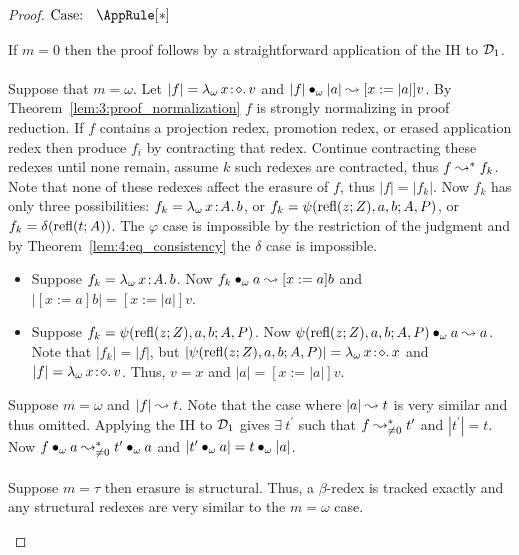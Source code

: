 \begin{proof}
    $\text{Case: }\begin{array}{c} \AppRule[*] \end{array}$
    \begin{proofcase}
        If $m = 0$ then the proof follows by a straightforward application of the IH to $\mathcal{D}_{1}$.
        \\ \\
        Suppose that $m = \omega$.
        Let $|f| = {\lambda_\omega}\, x\! : \! \diamond.\, v$ and $|f| \bullet_{\omega} |a| \leadsto [x := |a|]v$.
        By Theorem~\ref{lem:3:proof_normalization} $f$ is strongly normalizing in proof reduction.
        If $f$ contains a projection redex, promotion redex, or erased application redex then produce $f_i$ by contracting that redex.
        Continue contracting these redexes until none remain, assume $k$ such redexes are contracted, thus $f \leadsto^* f_k$.
        Note that none of these redexes affect the erasure of $f$, thus $|f| = |f_k|$.
        Now $f_k$ has only three possibilities: $f_k = {\lambda_\omega}\, x\! : \! A.\, b$, or $f_k = \psi(\textnormal{refl}(z; Z), a, b; A, P)$, or $f_k = \delta(\textnormal{refl}(t; A))$.
        The $\varphi$ case is impossible by the restriction of the judgment and by Theorem~\ref{lem:4:eq_consistency} the $\delta$ case is impossible.
        \begin{itemize}
            \item {
                Suppose $f_k = {\lambda_\omega}\, x\! : \! A.\, b$.
                Now $f_k \bullet_{\omega} a \leadsto [x := a]b$ and $|[x := a]b| = [x := |a|]v$.
            }
            \item {
                Suppose $f_k = \psi(\textnormal{refl}(z; Z), a, b; A, P)$.
                Now $\psi(\textnormal{refl}(z; Z), a, b; A, P) \bullet_{\omega} a \leadsto a$.
                Note that $|f_k| = |f|$, but $|\psi(\textnormal{refl}(z; Z), a, b; A, P)| = {\lambda_\omega}\, x\! : \! \diamond.\, x$ and $|f| = {\lambda_\omega}\, x\! : \! \diamond.\, v$.
                Thus, $v = x$ and $|a| = [x := |a|]v$.
            }
        \end{itemize}
        \vspace{.15in}
        Suppose $m = \omega$ and $|f| \leadsto t$.
        Note that the case where $|a| \leadsto t$ is very similar and thus omitted.
        Applying the IH to $\mathcal{D}_{1}$ gives $\exists\ t^\prime$ such that $f \leadsto^*_{\neq 0} t^\prime$ and $|t^\prime| = t$.
        Now $f \bullet_{\omega} a \leadsto^*_{\neq 0} t^\prime \bullet_{\omega} a$ and $|t^\prime \bullet_{\omega} a| = t \bullet_{\omega} |a|$.
        \\ \\
        Suppose $m = \tau$ then erasure is structural.
        Thus, a $\beta$-redex is tracked exactly and any structural redexes are very similar to the $m = \omega$ case.
    \end{proofcase}


\end{proof}
